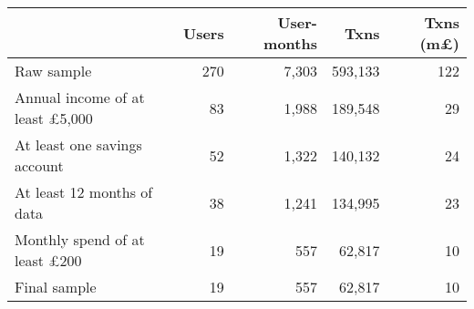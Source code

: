 \begin{tabular}{lrrrr}
\toprule
                                       & Users & User-months &    Txns & Txns (m\pounds) \\
\midrule
                            Raw sample &   270 &       7,303 & 593,133 &             122 \\
Annual income of at least \pounds5,000 &    83 &       1,988 & 189,548 &              29 \\
          At least one savings account &    52 &       1,322 & 140,132 &              24 \\
            At least 12 months of data &    38 &       1,241 & 134,995 &              23 \\
  Monthly spend of at least \pounds200 &    19 &         557 &  62,817 &              10 \\
                          Final sample &    19 &         557 &  62,817 &              10 \\
\bottomrule
\end{tabular}
